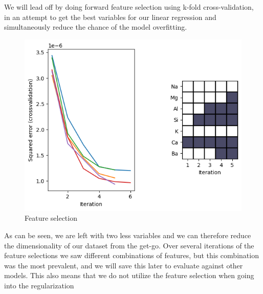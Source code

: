 We will lead off by doing forward feature selection using k-fold cross-validation, in an attempt to get the best variables for our linear regression and simultaneously reduce the chance of the model overfitting.\\
\begin{figure}[H]
    \centering
    \includegraphics[width=12cm]{images/featureselection.png}
    \caption{Feature selection}
    \label{fig:fig_select}
\end{figure}
As can be seen, we are left with two less variables and we can therefore reduce the dimensionality of our dataset from the get-go. Over several iterations of the feature selections we saw different combinations of features, but this combination was the most prevalent, and we will save this later to evaluate against other models. This also means that we do not utilize the feature selection when going into the regularization \\ \color[red]{Er meget usikker på det her, men giver fucking 0 mening at bruge feature selectionen ind i regularization og har kun gjort det fordi rapporten ligger op til det}

